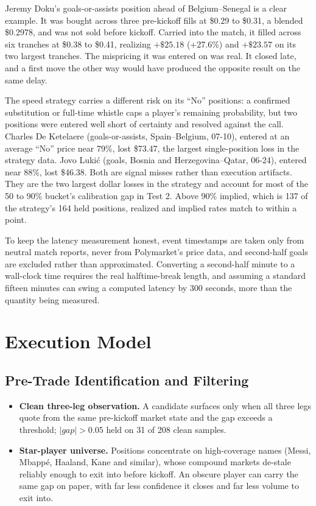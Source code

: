 \documentclass[12pt]{article}
\newcommand{\gap}{\ensuremath{\mathit{gap}}}
\begin{document}
Jeremy Doku's goals-or-assists position ahead of Belgium--Senegal is a clear
example. It was bought across three pre-kickoff fills at \$0.29 to \$0.31, a
blended \$0.2978, and was not sold before kickoff. Carried into the match, it
filled across six tranches at \$0.38 to \$0.41, realizing $+\$25.18$ (+27.6\%) and
$+\$23.57$ on its two largest tranches. The mispricing it was entered on was
real. It closed late, and a first move the other way would have produced the
opposite result on the same delay.

The speed strategy carries a different risk on its ``No'' positions: a confirmed
substitution or full-time whistle caps a player's remaining probability, but two
positions were entered well short of certainty and resolved against the call.
Charles De Ketelaere (goals-or-assists, Spain--Belgium, 07-10), entered at an
average ``No'' price near 79\%, lost \$73.47, the largest single-position loss in
the strategy data. Jovo Luki\'c (goals, Bosnia and Herzegovina--Qatar, 06-24),
entered near 88\%, lost \$46.38. Both are signal misses rather than execution
artifacts. They are the two largest dollar losses in the strategy and account for
most of the 50 to 90\% bucket's calibration gap in Test 2. Above 90\% implied,
which is 137 of the strategy's 164 held positions, realized and implied rates
match to within a point.

To keep the latency measurement honest, event timestamps are taken only from
neutral match reports, never from Polymarket's price data, and second-half goals
are excluded rather than approximated. Converting a second-half minute to a
wall-clock time requires the real halftime-break length, and assuming a standard
fifteen minutes can swing a computed latency by 300 seconds, more than the
quantity being measured.

\section{Execution Model}

\subsection{Pre-Trade Identification and Filtering}
\begin{itemize}
\item \textbf{Clean three-leg observation.} A candidate surfaces only when all
three legs quote from the same pre-kickoff market state and the gap exceeds a
threshold; $|\gap| > 0.05$ held on 31 of 208 clean samples.
\item \textbf{Star-player universe.} Positions concentrate on high-coverage names
(Messi, Mbapp\'e, Haaland, Kane and similar), whose compound markets de-stale
reliably enough to exit into before kickoff. An obscure player can carry the same
gap on paper, with far less confidence it closes and far less volume to exit
into.
\end{itemize}
\end{document}
